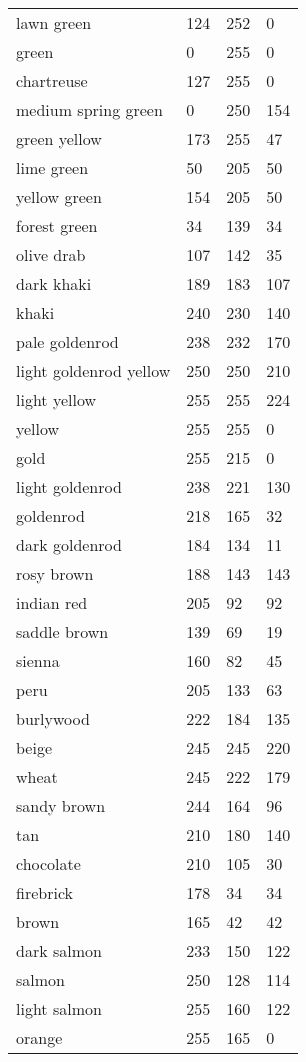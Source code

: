 \begin{center}
\begin{tabular}{llll}
  lawn green & 124 & 252 & 0  \\
  green & 0 & 255 & 0  \\
  chartreuse & 127 & 255 & 0  \\
  medium spring green & 0 & 250 & 154  \\
  green yellow & 173 & 255 & 47  \\
  lime green & 50 & 205 & 50  \\
  yellow green & 154 & 205 & 50  \\
  forest green & 34 & 139 & 34  \\
  olive drab & 107 & 142 & 35  \\
  dark khaki & 189 & 183 & 107  \\
  khaki & 240 & 230 & 140  \\
  pale goldenrod & 238 & 232 & 170  \\
  light goldenrod yellow & 250 & 250 & 210  \\
  light yellow & 255 & 255 & 224  \\
  yellow & 255 & 255 & 0  \\
  gold & 255 & 215 & 0  \\
  light goldenrod & 238 & 221 & 130  \\
  goldenrod & 218 & 165 & 32  \\
  dark goldenrod & 184 & 134 & 11  \\
  rosy brown & 188 & 143 & 143  \\
  indian red & 205 & 92 & 92  \\
  saddle brown & 139 & 69 & 19  \\
  sienna & 160 & 82 & 45  \\
  peru & 205 & 133 & 63  \\
  burlywood & 222 & 184 & 135  \\
  beige & 245 & 245 & 220  \\
  wheat & 245 & 222 & 179  \\
  sandy brown & 244 & 164 & 96  \\
  tan & 210 & 180 & 140  \\
  chocolate & 210 & 105 & 30  \\
  firebrick & 178 & 34 & 34  \\
  brown & 165 & 42 & 42  \\
  dark salmon & 233 & 150 & 122  \\
  salmon & 250 & 128 & 114  \\
  light salmon & 255 & 160 & 122  \\
  orange & 255 & 165 & 0  \\

\end{tabular}
\end{center}

